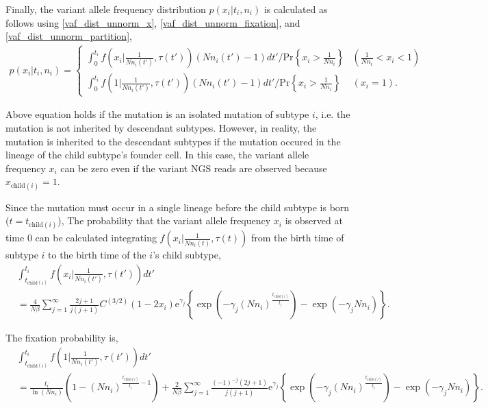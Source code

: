 \documentclass{article}
\begin{document}
Finally, the variant allele frequency distribution $p(x_i | t_i, n_i)$ is calculated as follows using \eqref{vaf_dist_unnorm_x}, \eqref{vaf_dist_unnorm_fixation}, and \eqref{vaf_dist_unnorm_partition},
\begin{align}
 p(x_i | t_i, n_i) = \begin{cases}
                      \int_{0}^{t_i} f\left(x_i\Big|\frac{1}{Nn_i(t')}, \tau(t')\right) (Nn_i(t') - 1) dt' \bigg/ \mathrm{Pr}\left\{ x_i > \frac{1}{Nn_i}\right\} & \left(\frac{1}{Nn_i} < x_i < 1\right)\\
                      \int_{0}^{t_i} f\left(1\Big|\frac{1}{Nn_i(t')}, \tau(t')\right) (Nn_i(t') - 1) dt' \bigg/ \mathrm{Pr}\left\{ x_i > \frac{1}{Nn_i}\right\} & \left(x_i = 1\right).\label{vaf_dist_norm}
                     \end{cases}
\end{align}

Above equation holds if the mutation is an isolated mutation of subtype $i$, i.e. the mutation is not inherited by descendant subtypes.
However, in reality, the mutation is inherited to the descendant subtypes if the mutation occured in the lineage of the child subtype's founder cell.
In this case, the variant allele frequency $x_i$ can be zero even if the variant NGS reads are observed because $x_{\mathrm{child}(i)} = 1$.

Since the mutation must occur in a single lineage before the child subtype is born ($t = t_{\mathrm{child}(i)}$),
The probability that the variant allele frequency $x_i$ is observed at time 0 can be calculated integrating $f\left(x_i| \frac{1}{Nn_i(t)}, \tau(t)\right)$ from the birth time of subtype $i$ to the birth time of the $i$'s child subtype,
\begin{align}
 & \int_{t_{\mathrm{child}(i)}}^{t_i} f\left(x_i\Big|\frac{1}{Nn_i(t')}, \tau(t')\right) dt'\nonumber\\
 & = \frac{4}{N\beta} \sum_{j=1}^{\infty} \frac{2j+1}{j(j+1)} C^{(3/2)}(1-2x_i)
 \mathrm{e}^{\gamma_j} \left\{ \exp\left(-\gamma_j\left(Nn_i\right)^{\frac{t_{\mathrm{child}(i)}}{t_i}}\right) - \exp(-\gamma_j Nn_i)\right\}.\label{vaf_dist_unnorm_inherited_x}
\end{align}

The fixation probability is,
\begin{align}
 & \int_{t_{\mathrm{child}(i)}}^{t_i} f\left(1\Big|\frac{1}{Nn_i(t')}, \tau(t')\right) dt'\nonumber\\
 & = \frac{t_i}{\ln(Nn_i)}\left(1 - (Nn_i)^{\frac{t_{\mathrm{child}(i)}}{t_i} - 1}\right)
 + \frac{2}{N\beta} \sum_{j=1}^{\infty} \frac{(-1)^{-j}(2j+1)}{j(j+1)}
 \mathrm{e}^{\gamma_j} \left\{ \exp\left(-\gamma_j\left(Nn_i\right)^{\frac{t_{\mathrm{child}(i)}}{t_i}}\right) - \exp(-\gamma_j Nn_i)\right\}.\label{vaf_dist_unnorm_inherited_fixation}
\end{align}
\end{document}
